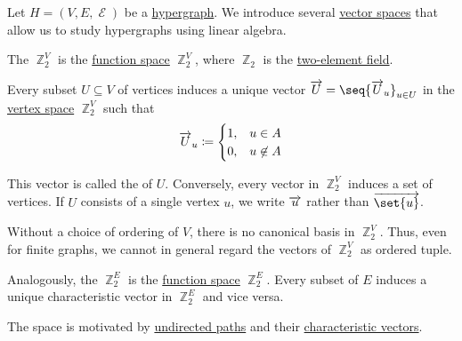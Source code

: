 \begin{definition}\label{def:hypergraph_vector_spaces}
  Let \( H = (V, E, \mscrE) \) be a \hyperref[def:hypergraph]{hypergraph}. We introduce several \hyperref[def:vector_space]{vector spaces} that allow us to study hypergraphs using linear algebra.

  \begin{thmenum}
     The  \( \BbbZ_2^V \) is the \hyperref[thm:functions_over_semimodule]{function space} \( \BbbZ_2^V \), where \( \BbbZ_2 \) is the \hyperref[thm:ring_of_integers_modulo_zero_divisors]{two-element field}.

    Every subset \( U \subseteq V \) of vertices induces a unique vector \( \vect{U} = \seq{ \vect{U}_u }_{u \in U} \) in the \hyperref[def:hypergraph_vector_spaces/vertex]{vertex space} \( \BbbZ_2^V \) such that
    \begin{equation*}
      \overrightarrow{U}_u \coloneqq \begin{cases}
        1, &u \in A \\
        0, &u \not\in A
      \end{cases}
    \end{equation*}

    This vector is called the  of \( U \). Conversely, every vector in \( \BbbZ_2^V \) induces a set of vertices. If \( U \) consists of a single vertex \( u \), we write \( \overrightarrow{u} \) rather than \( \vect{\set{u}} \).

    Without a choice of ordering of \( V \), there is no canonical basis in \( \BbbZ_2^V \). Thus, even for finite graphs, we cannot in general regard the vectors of \( \BbbZ_2^V \) as ordered tuple.

     Analogously, the  \( \BbbZ_2^E \) is the \hyperref[thm:functions_over_semimodule]{function space} \( \BbbZ_2^E \). Every subset of \( E \) induces a unique characteristic vector in \( \BbbZ_2^E \) and vice versa.

    The space is motivated by \hyperref[def:undirected_multigraph_path]{undirected paths} and their \hyperref[def:undirected_multigraph_path/characteristic_vector]{characteristic vectors}.
  \end{thmenum}
\end{definition}


